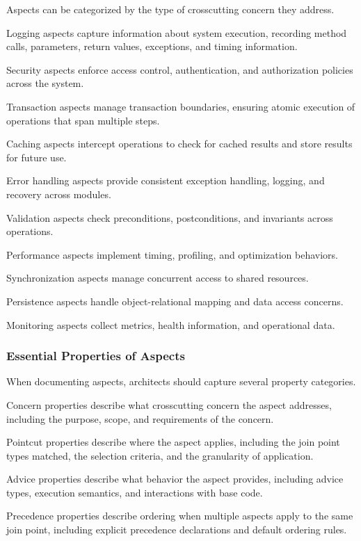 \documentclass[11pt]{article}
\begin{document}
Aspects can be categorized by the type of crosscutting concern they address.

Logging aspects capture information about system execution, recording method calls, parameters, return values, exceptions, and timing information.

Security aspects enforce access control, authentication, and authorization policies across the system.

Transaction aspects manage transaction boundaries, ensuring atomic execution of operations that span multiple steps.

Caching aspects intercept operations to check for cached results and store results for future use.

Error handling aspects provide consistent exception handling, logging, and recovery across modules.

Validation aspects check preconditions, postconditions, and invariants across operations.

Performance aspects implement timing, profiling, and optimization behaviors.

Synchronization aspects manage concurrent access to shared resources.

Persistence aspects handle object-relational mapping and data access concerns.

Monitoring aspects collect metrics, health information, and operational data.

\subsubsection{Essential Properties of Aspects}

When documenting aspects, architects should capture several property categories.

Concern properties describe what crosscutting concern the aspect addresses, including the purpose, scope, and requirements of the concern.

Pointcut properties describe where the aspect applies, including the join point types matched, the selection criteria, and the granularity of application.

Advice properties describe what behavior the aspect provides, including advice types, execution semantics, and interactions with base code.

Precedence properties describe ordering when multiple aspects apply to the same join point, including explicit precedence declarations and default ordering rules.
\end{document}
